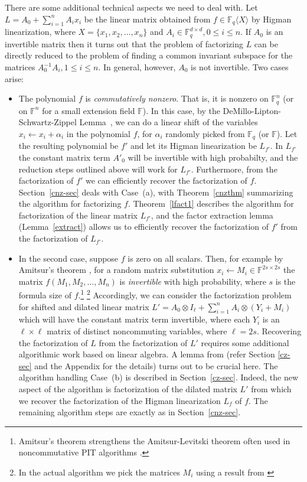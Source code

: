 \documentclass[10pt,a4paper]{article}
\newcommand{\F}{\mathbb{F}}
\renewcommand{\angle}[1]{\langle #1 \rangle}
\begin{document}
There are some additional technical aspects we need to deal with. 
%
%
%
%
Let $L=A_0+\sum_{i=1}^n A_i x_i$ be the linear matrix obtained from
$f\in\F_q\angle{X}$ by Higman linearization, where
$X=\{x_1,x_2,\ldots,x_n\}$ and $A_i\in \F_q^{d\times d}, 0\le i\le
n$. If $A_0$ is an invertible matrix then it turns out that the
problem of factorizing $L$ can be directly reduced to the problem of
finding a common invariant subspace for the matrices $A_0^{-1}A_i,
1\le i\le n$.  In general, however, $A_0$ is not invertible. Two cases
arise:
\begin{itemize}
\item[(a)] The polynomial $f$ is \emph{commutatively nonzero}. That
  is, it is nonzero on $\F_q^n$ (or on $\F^n$ for a small extension
  field $\F$). In this case, by the DeMillo-Lipton-Schwartz-Zippel
  Lemma~\cite{DL78,Sch80, Zip79}, we can do a linear shift of the
  variables $x_i\leftarrow x_i+\alpha_i$ in the polynomial $f$, for
  $\alpha_i$ randomly picked from $\F_q$ (or $\F$). Let the resulting
  polynomial be $f'$ and let its Higman linearization be $L_{f'}$. In
  $L_{f'}$ the constant matrix term $A'_0$ will be invertible with
  high probabilty, and the reduction steps outlined above will work
  for $L_{f'}$. Furthermore, from the factorization of $f'$ we can
  efficiently recover the factorization of $f$. Section~\ref{cnz-sec}
  deals with Case~(a), with Theorem~\ref{cnzthm} summarizing the
  algorithm for factorizing $f$. Theorem~\ref{lfact1} describes the
  algorithm for factorization of the linear matrix $L_{f'}$, and the
  factor extraction lemma (Lemma~\ref{extract}) allows us to
  efficiently recover the factorization of $f'$ from the factorization
  of $L_{f'}$.
  
\item[(b)] In the second case, suppose $f$ is zero on all scalars. Then, for example by
  Amitsur's theorem \cite{Ami66}, for a random matrix substitution
  $x_i\leftarrow M_i\in \F^{2s\times 2s}$ the matrix
  $f(M_1,M_2,\ldots,M_n)$ is \emph{invertible} with high probability,
  where $s$ is the formula size of $f$.\footnote{Amitsur's theorem
    strengthens the Amitsur-Levitski theorem \cite{AL50} often used in
    noncommutative PIT algorithms \cite{BW05}.} \footnote{In the actual algorithm we pick the matrices $M_i$ using a result from  \cite{DM17}}   Accordingly, we can
  consider the factorization problem for shifted and dilated linear
  matrix $L'=A_0\otimes I_{\ell} + \sum_{i=1}^n A_i\otimes (Y_i+M_i)$ which             
  will have the constant matrix term invertible, where each $Y_i$ is  
  an $\ell \times \ell$ matrix of distinct noncommuting variables, where $\ell=2s$.  Recovering
  the factorization of $L$ from the factorization of $L'$ requires
  some additional algorithmic work based on linear algebra. A lemma
  from \cite{HKV20} (refer Section \ref{cz-sec} and the Appendix for the details) turns
  out to be crucial here. The algorithm handling Case~(b) is described
  in Section~\ref{cz-sec}. Indeed, the new aspect of the algorithm is
  factorization of the dilated matrix $L'$ from which we recover the
  factorization of the Higman linearization $L_f$ of $f$. The
  remaining algorithm steps are exactly as in Section~\ref{cnz-sec}.
\end{itemize}  
\end{document}
